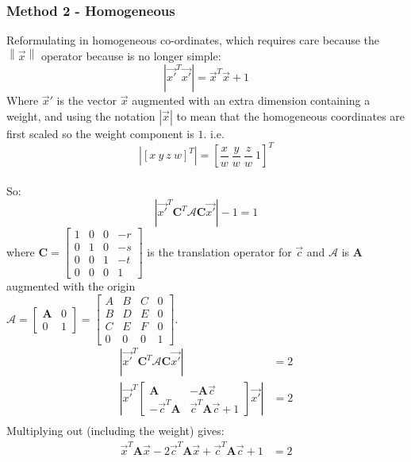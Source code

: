 \documentclass{article}
\def\mat#1{\mathbf{#1}}
\begin{document}
\subsubsection{Method 2 - Homogeneous}
Reformulating in homogeneous co-ordinates, which requires care because the $\left\|
\vec{x} \right\|$ operator because is no longer simple: 
\begin{equation}
\left| \vec{x'}^T\vec{x'} \right| = \vec{x}^T \vec{x} + 1
\end{equation}
Where $\vec{x}'$ is the vector $\vec{x}$ augmented with an extra dimension
containing a weight, and using the notation $\left|\vec{x}\right|$ to mean 
that the homogeneous coordinates are
first scaled so the weight component is $1$. i.e. 
\begin{equation*}
\left| \left[ x ~ y ~ z ~ w \right]^T \right| = 
\left[ \frac{x}{w} ~ \frac{y}{w} ~ \frac{z}{w}
~ {1} \right]^T
\end{equation*}
\\
So:
\begin{equation} \left| \vec{x'}^T\mat{C}^T \mathcal{A}\mat{C} \vec{x'} \right| -1 = 1
\end{equation}
where $\mat{C}=\left[\begin{smallmatrix}
1 & 0 & 0 & -r\\ 0 & 1 & 0 & -s\\ 0 & 0 & 1 & -t\\ 0 & 0 & 0 & 1
\end{smallmatrix} \right]$ is the translation operator for $\vec{c}$ and $\mathcal{A}$ is
$\mat{A}$ augmented with the origin\\
$\mathcal{A}= \left[\begin{array}{c|c}
\mat{A} & 0 \\ \hline 0 & 1 \end{array}\right] = \left[\begin{smallmatrix}
A & B & C & 0\\ B & D & E & 0\\ C & E & F & 0\\ 0 & 0 & 0 & 1
\end{smallmatrix} \right]$.
%
\begin{equation}
\begin{split}
\left| \vec{x'}^T\mat{C}^T \mathcal{A} \mat{C} \vec{x'}\right| &= 2\\
\left|\vec{x'}^T\left[\begin{array}{c|c}
\mat{A} & -\mat{A}\vec{c} \\ 
\hline
-\vec{c}^T\mat{A} & \vec{c}^T \mat{A} \vec{c}+1 
\end{array} \right]\vec{x'} \right| &= 2 \\
\end{split}
\end{equation}
Multiplying out (including the weight) gives:
\begin{equation}
\begin{split}
\vec{x}^T \mat{A}\vec{x} - 2\vec{c}^T\mat{A}\vec{x} + \vec{c}^T\mat{A}\vec{c} + 1 &= 2\\
\end{split}
\end{equation}
%
\end{document}

